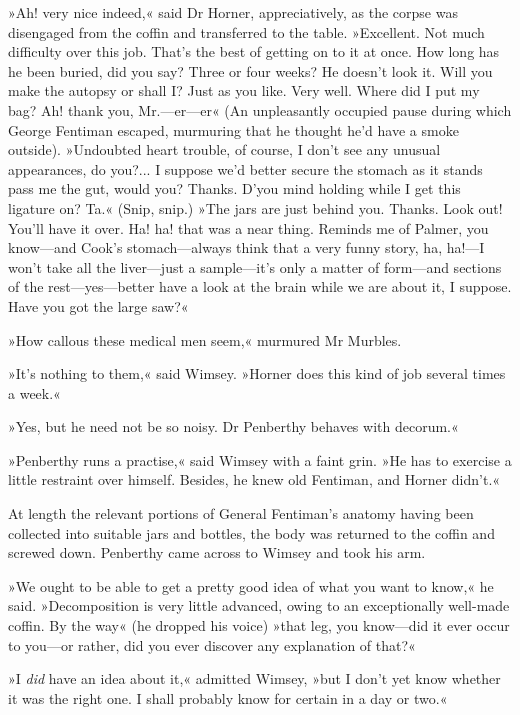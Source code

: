 »Ah! very nice indeed,« said Dr Horner, appreciatively, as the corpse was disengaged from the coffin and transferred to the table. »Excellent. Not much difficulty over this job. That's the best of getting on to it at once. How long has he been buried, did you say? Three or four weeks? He doesn't look it. Will you make the autopsy or shall I? Just as you like. Very well. Where did I put my bag? Ah! thank you, Mr.—er—er\longdash« (An unpleasantly occupied pause during which George Fentiman escaped, murmuring that he thought he'd have a smoke outside). »Undoubted heart trouble, of course, I don't see any unusual appearances, do you?... I suppose we'd better secure the stomach as it stands \textellipsis  pass me the gut, would you? Thanks. D'you mind holding while I get this ligature on? Ta.« (Snip, snip.) »The jars are just behind you. Thanks. Look out! You'll have it over. Ha! ha! that was a near thing. Reminds me of Palmer, you know—and Cook's stomach—always think that a very funny story, ha, ha!—I won't take all the liver—just a sample—it's only a matter of form—and sections of the rest—yes—better have a look at the brain while we are about it, I suppose. Have you got the large saw?«

»How callous these medical men seem,« murmured Mr Murbles.

»It's nothing to them,« said Wimsey. »Horner does this kind of job several times a week.«

»Yes, but he need not be so noisy. Dr Penberthy behaves with decorum.«

»Penberthy runs a practise,« said Wimsey with a faint grin. »He has to exercise a little restraint over himself. Besides, he knew old Fentiman, and Horner didn't.«

At length the relevant portions of General Fentiman's anatomy having been collected into suitable jars and bottles, the body was returned to the coffin and screwed down. Penberthy came across to Wimsey and took his arm.

»We ought to be able to get a pretty good idea of what you want to know,« he said. »Decomposition is very little advanced, owing to an exceptionally well-made coffin. By the way« (he dropped his voice) »that leg, you know—did it ever occur to you—or rather, did you ever discover any explanation of that?«

»I \textit{did} have an idea about it,« admitted Wimsey, »but I don't yet know whether it was the right one. I shall probably know for certain in a day or two.«

